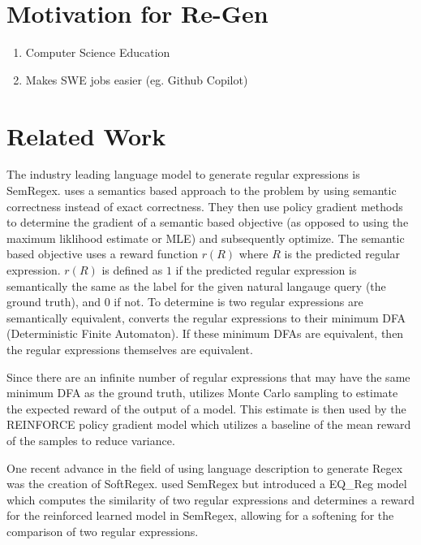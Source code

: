 \documentclass[11pt,a4paper]{article}
\begin{document}
\section{Motivation for Re-Gen}

\begin{enumerate}
	\item
	Computer Science Education

	\item
	Makes SWE jobs easier (eg. Github Copilot)

\end{enumerate}


\section{Related Work}
The industry leading language model to generate regular expressions is SemRegex. \cite{zhong-etal-2018-semregex} uses a semantics based approach to the problem by using semantic correctness instead of exact correctness. They then use policy gradient methods \cite{Williams:92} to determine the gradient of a semantic based objective (as opposed to using the maximum liklihood estimate or MLE) and subsequently optimize. The semantic based objective uses a reward function $r(R)$ where $R$ is the predicted regular expression. $r(R)$ is defined as $1$ if the predicted regular expression is semantically the same as the label for the given natural langauge query (the ground truth), and $0$ if not. To determine is two regular expressions are semantically equivalent, \cite{zhong-etal-2018-semregex} converts the regular expressions to their minimum DFA (Deterministic Finite Automaton). If these minimum DFAs are equivalent, then the regular expressions themselves are equivalent. 

Since there are an infinite number of regular expressions that may have the same minimum DFA as the ground truth, \cite{zhong-etal-2018-semregex} utilizes Monte Carlo sampling to estimate the expected reward of the output of a model. This estimate is then used by the REINFORCE policy gradient model \cite{Williams:92} which utilizes a baseline of the mean reward of the samples to reduce variance.

One recent advance in the field of using language description to generate Regex was the creation of SoftRegex. \cite{park-etal-2019-softregex} used SemRegex but introduced a EQ\_Reg model which computes the similarity of two regular expressions and determines a reward for the reinforced learned model in SemRegex, allowing for a softening for the comparison of two regular expressions. 
\end{document}
